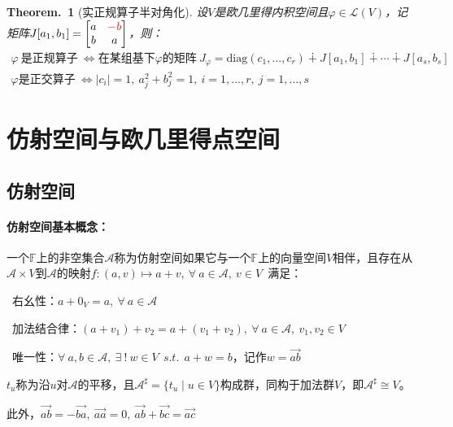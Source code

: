\documentclass[zihao=-4,UTF8]{report}
\def\F{\mathbb{F}}
\def\A{\mathscr{A}}
\theoremstyle{mystyle} %
\newtheorem{theorem}{Theorem.\,}
\begin{document}
\begin{theorem}[实正规算子半对角化]\label{实正规算子半对角化}
设$V$是欧几里得内积空间且$\varphi \in \mathscr{L}(V)$，记矩阵$J[a_1,b_1] = \begin{bmatrix}
    a& \textcolor{red}{-b} \\
    b& a
  \end{bmatrix}$，则：
\begin{gather*}
\varphi\ \text{是正规算子}\ \Longleftrightarrow \text{在某组基下$\varphi$的矩阵}\ J_\varphi = \text{diag}(c_1,...,c_r) \dotplus J[a_1,b_1] \dotplus \cdots \dotplus J[a_s,b_s]\\
\varphi \text{是正交算子}\ \Longleftrightarrow |c_i|=1,\ a_j^2+b_j^2 = 1,\ i=1,...,r,\ j = 1,...,s
\end{gather*}
{\par\color{gray}\small
\par}

\end{theorem}

\chapter{仿射空间与欧几里得点空间}

\section{仿射空间}
\subsubsection{仿射空间基本概念：}
一个$\F$上的非空集合$\A$称为仿射空间如果它与一个$\F$上的向量空间$V$相伴，且存在从$\A\times V$到$\A$的映射$f:(a,v) \longmapsto a+v,\ \forall\ a\in \A,\ v\in V$\ 满足：
\par{}\ 右幺性：$a+0_{V} = a,\ \forall\ a\in \A$\par
{}\  加法结合律：$(a+v_1)+v_2 = a+(v_1+v_2),\ \forall\ a\in \A,\ v_1,v_2\in V$   \par
{}\  唯一性：$\forall\ a,b\in \A,\ \exists\ !\ w \in V\ \ s.t.\ \ a+w=b$，记作$w = \overrightarrow{ab}  $ \par

$t_u$称为沿$u$对$\A$的平移，且$\A^{\sharp } = \{t_u\mid u\in V\}$构成群，同构于加法群$V$，即$\A^{\sharp } \cong V$。

此外，$\overrightarrow{ab} = -\overrightarrow{ba},\ \overrightarrow{aa}=0,\  \overrightarrow{ab}+ \overrightarrow{bc} =  \overrightarrow{ac}$
\end{document}
